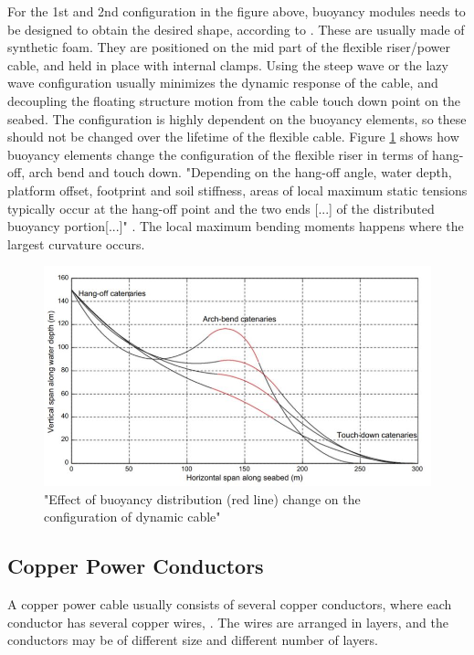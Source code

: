 \noindent For the 1st and 2nd configuration in the figure above, buoyancy modules needs to be designed to obtain the desired shape, according to \cite{srinil2016}. These are usually made of synthetic foam. They are positioned on the mid part of the flexible riser/power cable, and held in place with internal clamps. Using the steep wave or the lazy wave configuration usually minimizes the dynamic response of the cable, and decoupling the floating structure motion from the cable touch down point on the seabed. The configuration is highly dependent on the buoyancy elements, so these should not be changed over the lifetime of the flexible cable. Figure \ref{fig:bend} shows how buoyancy elements change the configuration of the flexible riser in terms of hang-off, arch bend and touch down. "Depending on the hang-off angle, water depth, platform offset, footprint and soil stiffness, areas of local maximum static tensions typically occur at the hang-off point and
the two ends [...] of the distributed buoyancy portion[...]" \cite{srinil2016}. The local maximum bending moments happens where the largest curvature occurs.

\begin{figure}[H]
\centering
\includegraphics[scale=0.6]{figures/bend}
\caption[$\; \:$Effect of buoyancy distribution]{"Effect of buoyancy distribution (red line) change on the configuration of dynamic
cable" \cite{srinil2016}}
 \label{fig:bend}
\end{figure}

\subsection{Copper Power Conductors}
  A copper power cable usually consists of several copper conductors, where each conductor has several copper wires, \cite{Nasution2013}. The wires are arranged in layers, and the conductors may be of different size and different number of layers.
  
